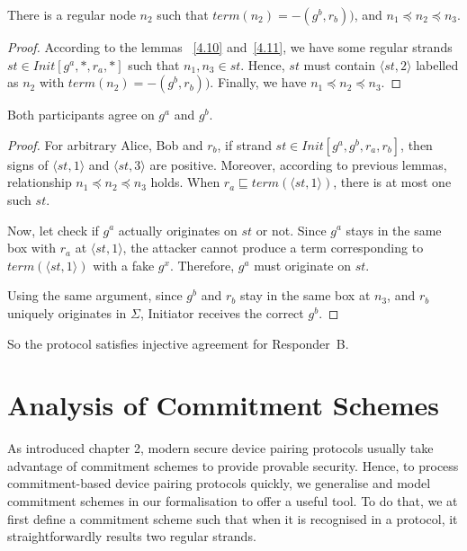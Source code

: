 \begin{Lemma}\label{4.12}
There is a regular node $n_2$ such that $term(n_2)= -(g^b,r_b))$, and $n_1 \preceq n_2 \preceq n_3$.
\end{Lemma}

\begin{proof}
According to the lemmas ~\ref{4.10} and~\ref{4.11}, we have some regular strands $st \in Init[g^a,*, r_a,*]$ such that $n_1, n_3 \in st$. 
Hence, $st$ must contain $\langle st,2 \rangle$ labelled as $n_2$ with $term(n_2)= -(g^b,r_b))$. Finally, we have $n_1 \preceq n_2 \preceq n_3$.
\end{proof}

\begin{Lemma}\label{lemme4.13}
Both participants agree on $g^a$ and $g^b$. 
\end{Lemma}

\begin{proof}
For arbitrary Alice, Bob and $r_b$, if strand $st \in Init[g^a,g^b,r_a,r_b]$, then signs of $\langle st,1 \rangle$ and $\langle st,3 \rangle$ are positive. Moreover, according to previous lemmas, relationship $n_1 \preceq n_2 \preceq n_3$ holds. When $r_a \sqsubseteq term(\langle st,1 \rangle )$, there is at most one such $st$.

Now, let check if $g^a$ actually originates on $st$ or not. Since $g^a$ stays in the same box with $r_a$ at $\langle st,1 \rangle$, the attacker cannot produce a term corresponding to $term(\langle st,1 \rangle )$ with a fake $g^{x}$. Therefore, $g^a$ must originate on $st$. 

Using the same argument, since $g^b$ and $r_b$ stay in the same box at $n_3$, and $r_b$ uniquely originates in $\Sigma$, Initiator receives the correct $g^b$.
\end{proof}

So the protocol satisfies injective agreement for Responder~B. 

\section{Analysis of Commitment Schemes}

As introduced chapter 2, modern secure device pairing protocols usually take advantage of commitment schemes to provide provable security. Hence, to process commitment-based device pairing protocols quickly, we generalise and model commitment schemes in our formalisation to offer a useful tool. To do that, we at first define a commitment scheme such that when it is recognised in a protocol, it straightforwardly results two regular strands. 


